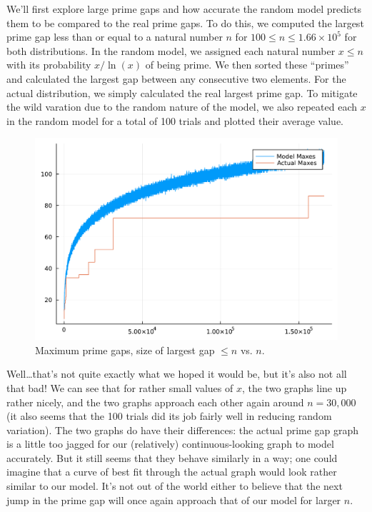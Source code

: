 \documentclass[conference]{IEEEtran}
\begin{document}
We'll first explore large prime gaps and how accurate the
random model predicts them to be compared to the real
prime gaps. To do this, we computed the largest prime gap
less than or equal to a natural number $n$ for
$100 \le n \le 1.66 \times 10^5$ for both distributions.
In the random model, we assigned each natural number $x \le n$
with its probability $x/\ln(x)$ of being prime. We then sorted
these ``primes'' and calculated the largest gap between
any consecutive two elements. For the actual distribution, we
simply calculated the real largest prime gap. To mitigate the wild
varation due to the random nature of the model, we also repeated
each $x$ in the random model for a total of 100 trials and
plotted their average value.

\begin{figure}[H]
  \centering
  \includegraphics[width=\linewidth,keepaspectratio]{random-plot1.pdf}
  \caption{Maximum prime gaps, size of largest gap $\le n$ vs. $n$.}
\end{figure}

Well\ldots that's not quite exactly what we hoped it would be,
but it's also not all that bad! We can see that for rather
small values of $x$, the two graphs line up rather nicely,
and the two graphs approach each other again around $n = 30{,}000$
(it also seems that the 100 trials did its job fairly well in reducing
random variation). The two graphs do have their differences:
the actual prime gap graph is a little too jagged for our
(relatively) continuous-looking graph to model accurately. But it
still seems that they behave similarly in a way; one could imagine that
a curve of best fit through the actual graph would look rather similar
to our model. It's not out of the world either to believe that the next
jump in the prime gap will once again approach that of
our model for larger $n$.
\end{document}
